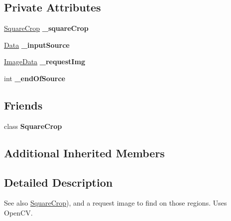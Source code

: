 \subsection*{Private Attributes}
\begin{DoxyCompactItemize}
\item 
\mbox{\label{classfilter_1_1data_1_1_pattern_data_a0fd2850d9953915647f4446f4a1dfe72}} 
\hyperlink{classfilter_1_1data_1_1_square_crop}{Square\+Crop} {\bfseries \+\_\+square\+Crop}
\item 
\mbox{\label{classfilter_1_1data_1_1_pattern_data_aca167afa82a72dc9ccbfcde074ae9df8}} 
\hyperlink{classfilter_1_1data_1_1_data}{Data} {\bfseries \+\_\+input\+Source}
\item 
\mbox{\label{classfilter_1_1data_1_1_pattern_data_a2af934af2c017186567dd9ad1284e10f}} 
\hyperlink{classfilter_1_1data_1_1_image_data}{Image\+Data} {\bfseries \+\_\+request\+Img}
\item 
\mbox{\label{classfilter_1_1data_1_1_pattern_data_a060dc9a9eb0ea4ecfdbaf9f66a630fe1}} 
int {\bfseries \+\_\+end\+Of\+Source}
\end{DoxyCompactItemize}
\subsection*{Friends}
\begin{DoxyCompactItemize}
\item 
\mbox{\label{classfilter_1_1data_1_1_pattern_data_a61f4c5b9581786c048a453f0673007ae}} 
class {\bfseries Square\+Crop}
\end{DoxyCompactItemize}
\subsection*{Additional Inherited Members}


\subsection{Detailed Description}
\begin{DoxySeeAlso}{See also}
\hyperlink{classfilter_1_1data_1_1_square_crop}{Square\+Crop}), and a request image to find on those regions. Uses Open\+CV. 
\end{DoxySeeAlso}



